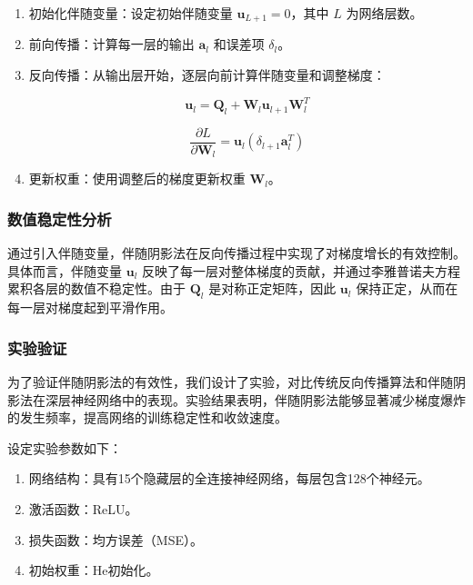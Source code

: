 \documentclass[12pt,a4paper]{amsart}
\begin{document}
\begin{enumerate}

  \item 初始化伴随变量：设定初始伴随变量 \( \mathbf{u}_{L+1} = 0 \)，其中 \( L \) 为网络层数。

  \item 前向传播：计算每一层的输出 \( \mathbf{a}_l \) 和误差项 \( \delta_l \)。

  \item 反向传播：从输出层开始，逐层向前计算伴随变量和调整梯度：

  \[ \mathbf{u}_l = \mathbf{Q}_l + \mathbf{W}_l \mathbf{u}_{l+1} \mathbf{W}_l^T \]

  \[ \frac{\partial L}{\partial \mathbf{W}_l} = \mathbf{u}_l (\delta_{l+1} \mathbf{a}_l^T) \]

  \item 更新权重：使用调整后的梯度更新权重 \( \mathbf{W}_l \)。

\end{enumerate}

\subsubsection{数值稳定性分析}

通过引入伴随变量，伴随阴影法在反向传播过程中实现了对梯度增长的有效控制。具体而言，伴随变量 \( \mathbf{u}_l \) 反映了每一层对整体梯度的贡献，并通过李雅普诺夫方程累积各层的数值不稳定性。由于 \( \mathbf{Q}_l \) 是对称正定矩阵，因此 \( \mathbf{u}_l \) 保持正定，从而在每一层对梯度起到平滑作用。

\subsubsection{实验验证}

为了验证伴随阴影法的有效性，我们设计了实验，对比传统反向传播算法和伴随阴影法在深层神经网络中的表现。实验结果表明，伴随阴影法能够显著减少梯度爆炸的发生频率，提高网络的训练稳定性和收敛速度。

设定实验参数如下：

\begin{enumerate}

  \item 网络结构：具有15个隐藏层的全连接神经网络，每层包含128个神经元。

  \item 激活函数：ReLU。

  \item 损失函数：均方误差（MSE）。

  \item 初始权重：He初始化。

\end{enumerate}
\end{document}
